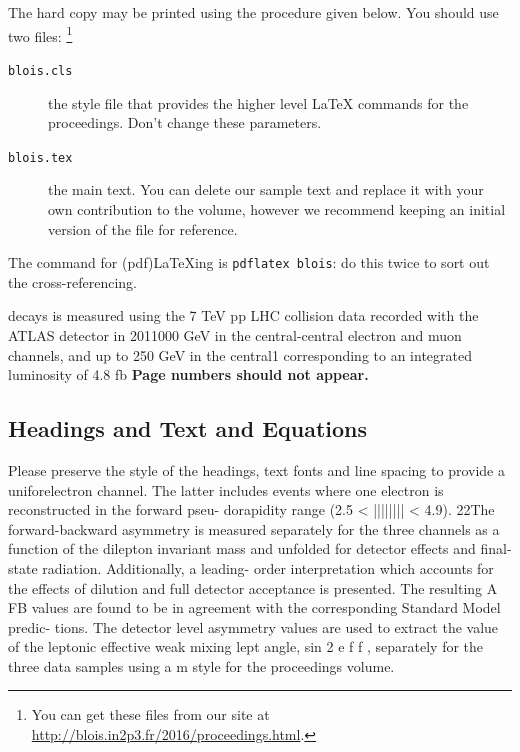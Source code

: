 \documentclass{blois}
\begin{document}
The hard copy may be printed using the procedure given below.
You should use
two files: \footnote{You can get these files from
our site at \url{http://blois.in2p3.fr/2016/proceedings.html}.}
\begin{description}
\item[\texttt{blois.cls}] the style file that provides the higher
level \LaTeX{} commands for the proceedings. Don't change these parameters.
\item[\texttt{blois.tex}] the main text. You can delete our sample
text and replace it with your own contribution to the volume, however we
recommend keeping an initial version of the file for reference.
\end{description}
The command for (pdf)\LaTeX ing is \texttt{pdflatex blois}: do this twice to
sort out the cross-referencing.

 decays is measured using the
7 TeV pp LHC collision data recorded with the ATLAS detector in 2011000 GeV in the central-central electron and muon channels, and up to 250 GeV in the central1 corresponding to an integrated
luminosity of 4.8 fb {\bf Page numbers should not appear.}

\subsection{Headings and Text and Equations}

Please preserve the style of the
headings, text fonts and line spacing to provide a
uniforelectron channel. The latter includes events where one electron is reconstructed in the forward pseu-
dorapidity range (2.5 < |||||||| < 4.9).
22The forward-backward asymmetry is measured separately for the three channels as a function of the
dilepton invariant mass and unfolded for detector effects and final-state radiation. Additionally, a leading-
order interpretation which accounts for the effects of dilution and full detector acceptance is presented.
The resulting A FB values are found to be in agreement with the corresponding Standard Model predic-
tions.
The detector level asymmetry values are used to extract the value of the leptonic effective weak mixing
lept
angle, sin 2         e f f , separately for the three data samples using a m style for the proceedings volume.
\end{document}
